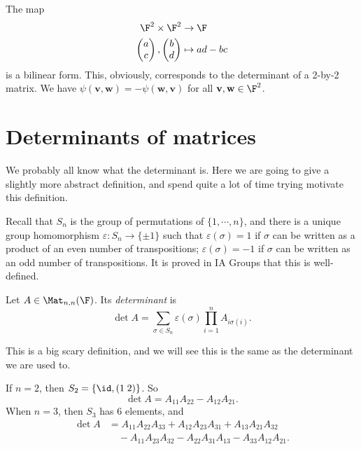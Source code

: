 \documentclass[a4paper]{article}
\begin{document}
\begin{eg}
  The map
  \begin{align*}
    \F^2 \times \F^2 &\to \F\\
    \begin{pmatrix}
      a\\c
    \end{pmatrix},
    \begin{pmatrix}
      b\\d
    \end{pmatrix} &\mapsto ad - bc
  \end{align*}
  is a bilinear form. This, obviously, corresponds to the determinant of a 2-by-2 matrix. We have $\psi(\mathbf{v}, \mathbf{w}) = -\psi(\mathbf{w}, \mathbf{v})$ for all $\mathbf{v}, \mathbf{w}\in \F^2$.
\end{eg}

\section{Determinants of matrices}
We probably all know what the determinant is. Here we are going to give a slightly more abstract definition, and spend quite a lot of time trying motivate this definition.

Recall that $S_n$ is the group of permutations of $\{1, \cdots, n\}$, and there is a unique group homomorphism $\varepsilon: S_n \to \{\pm 1\}$ such that $\varepsilon(\sigma) = 1$ if $\sigma$ can be written as a product of an even number of transpositions; $\varepsilon(\sigma) = -1$ if $\sigma$ can be written as an odd number of transpositions. It is proved in IA Groups that this is well-defined.

\begin{defi}[Determinant]
  Let $A \in \Mat_{n, n}(\F)$. Its \emph{determinant} is
  \[
    \det A = \sum_{\sigma \in S_n} \varepsilon(\sigma) \prod_{i = 1}^n A_{i \sigma(i)}.
  \]
\end{defi}
This is a big scary definition, and we will see this is the same as the determinant we are used to.

\begin{eg}
  If $n = 2$, then $S_2 = \{\id, (1\; 2)\}$. So
  \[
    \det A = A_{11}A_{22} - A_{12} A_{21}.
  \]
  When $n = 3$, then $S_3$ has 6 elements, and
  \begin{align*}
    \det A &= A_{11}A_{22}A_{33} + A_{12}A_{23}A_{31} + A_{13}A_{21}A_{32}\\
    &\quad - A_{11}A_{23}A_{32} - A_{22}A_{31}A_{13} - A_{33}A_{12}A_{21}.
  \end{align*}
\end{eg}
\end{document}
